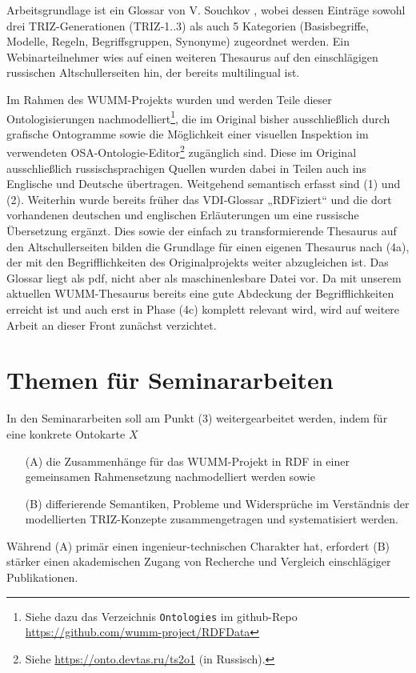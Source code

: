 \documentclass[11pt,a4paper]{article}
\begin{document}
Arbeitsgrundlage ist ein Glossar von V. Souchkov \cite{SG}, wobei dessen
Einträge sowohl drei TRIZ-Generationen (TRIZ-1..3) als auch 5 Kategorien
(Basisbegriffe, Modelle, Regeln, Begriffsgruppen, Synonyme) zugeordnet
werden. Ein Webinarteilnehmer wies auf einen weiteren Thesaurus auf den
einschlägigen russischen Altschullerseiten hin, der bereits multilingual ist.

Im Rahmen des WUMM-Projekts wurden und werden Teile dieser Ontologisierungen
nachmodelliert\footnote{Siehe dazu das Verzeichnis \texttt{Ontologies} im
  github-Repo \url{https://github.com/wumm-project/RDFData}}, die im Original
bisher ausschließlich durch grafische Ontogramme sowie die Möglichkeit einer
visuellen Inspektion im verwendeten OSA-Ontologie-Editor\footnote{Siehe
  \url{https://onto.devtas.ru/ts2o1} (in Russisch).} zugänglich sind.  Diese
im Original ausschließlich russischsprachigen Quellen wurden dabei in Teilen
auch ins Englische und Deutsche übertragen.  Weitgehend semantisch erfasst
sind (1) und (2). Weiterhin wurde bereits früher das VDI-Glossar „RDFiziert“
und die dort vorhandenen deutschen und englischen Erläuterungen um eine
russische Übersetzung ergänzt. Dies sowie der einfach zu transformierende
Thesaurus auf den Altschullerseiten bilden die Grundlage für einen eigenen
Thesaurus nach (4a), der mit den Begriff\-lichkeiten des Originalprojekts
weiter abzugleichen ist.  Das Glossar \cite{SG} liegt als pdf, nicht aber als
maschinenlesbare Datei vor. Da mit unserem aktuellen WUMM-Thesaurus bereits
eine gute Abdeckung der Begriff\-lichkeiten erreicht ist und \cite{SG} auch
erst in Phase (4c) komplett relevant wird, wird auf weitere Arbeit an dieser
Front zunächst verzichtet.

\section{Themen für Seminararbeiten}

In den Seminararbeiten soll am Punkt (3) weitergearbeitet werden, indem für
eine konkrete Ontokarte $X$ 
\begin{itemize}
\item[(A)] die Zusammenhänge für das WUMM-Projekt in RDF in einer gemeinsamen
  Rahmensetzung nachmodelliert werden sowie
\item[(B)] differierende Semantiken, Probleme und Widersprüche im Verständnis
  der modellierten TRIZ-Konzepte zusammengetragen und systematisiert werden.  
\end{itemize}
Während (A) primär einen ingenieur-technischen Charakter hat, erfordert (B)
stärker einen akademischen Zugang von Recherche und Vergleich einschlägiger
Publikationen.
\end{document}
